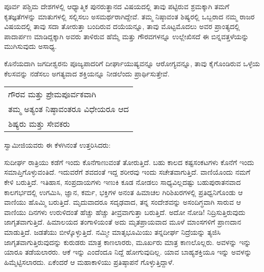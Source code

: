 ಪೂರ್ವ ಪಶ್ಚಿಮ ದೇಶಗಳಲ್ಲಿ ಆಧ್ಯಾತ್ಮಿಕ ಪುನರುತ್ಥಾನದ ವಿಷಯದಲ್ಲಿ ತಾವು ಪಟ್ಟಿರುವ ಶ್ರಮಕ್ಕಾಗಿ ತಮಗೆ ಕೃತಜ್ಞತೆಗಳನ್ನು ಮಾತುಗಳಲ್ಲಿ ಸಲ್ಲಿಸಲು ಅಸಮರ್ಥರಾಗಿದ್ದೇವೆ. ತಮ್ಮ ನಿಷ್ಠಾವಂತ ಶಿಷ್ಯರಲ್ಲಿ ಒಬ್ಬರಾದ ನಮ್ಮ ರಾಜರ ವಿಷಯದಲ್ಲಿ ತಾವು ಸದಾ ತೋರುತ್ತಾ ಬಂದಿರುವ ದಯೆಯನ್ನೂ, ತಾವು ಮೊಟ್ಟಮೊದಲು ಅವರ ಪ್ರಾಂತ್ಯದಲ್ಲಿ ಪಾದಾರ್ಪಣ ಮಾಡಿದ್ದಕ್ಕಾಗಿ ಅವರು ತಾಳಿರುವ ಹೆಮ್ಮೆ ಮತ್ತು ಗೌರವಗಳನ್ನೂ ಉಲ್ಲೇಖಿಸದೆ ಈ ಬಿನ್ನವತ್ತಳೆಯನ್ನು ಮುಗಿಸುವುದು ಅಸಾಧ್ಯ.

\vskip 2pt

ಕೊನೆಯದಾಗಿ ಜಗದೀಶ್ವರನು ಪೂಜ್ಯಪಾದರಿಗೆ ದೀರ್ಘಾಯುಷ್ಯವನ್ನೂ ಆರೋಗ್ಯವನ್ನೂ, ತಾವು ಕೈಗೊಂಡಿರುವ ಒಳ್ಳೆಯ ಕೆಲಸವನ್ನು ನಡೆಸಲು ಅಗತ್ಯವಾದ ಶಕ್ತಿಯನ್ನೂ ನೀಡಲೆಂದು ಪ್ರಾರ್ಥಿಸುತ್ತೇವೆ.

\medskip
\medskip

\begin{longtable}[r]{@{}l@{}}
ಗೌರವ ಮತ್ತು ಪ್ರೇಮಪೂರ್ವಕವಾಗಿ \\
ತಮ್ಮ ಅತ್ಯಂತ ನಿಷ್ಠಾವಂತರೂ ವಿಧೇಯರೂ ಆದ \\
ಶಿಷ್ಯರು ಮತ್ತು ಸೇವಕರು 
\end{longtable}

\medskip


ಸ್ವಾಮೀಜಿಯವರು ಈ ಕೆಳಗಿನಂತೆ ಉತ್ತರಿಸಿದರು:


\vskip 2pt

ಸುದೀರ್ಘ ರಾತ್ರಿಯು ಕಡೆಗೆ ಇಂದು ಕೊನೆಗಾಣುವಂತೆ ತೋರುತ್ತಿದೆ. ಬಹು ಕಾಲದ ಕಷ್ಟಸಂಕಟಗಳು ಕೊನೆಗೆ ಇಂದು ಸಮಾಪ್ತಿಗೊಳ್ಳುವಂತಿದೆ. ಇದುವರೆಗೆ ಶವದಂತೆ ಇದ್ದ ಶರೀರವು ಇಂದು ಸಚೇತವಾಗುತ್ತಿದೆ. ವಾಣಿಯೊಂದು ನಮಗೆ ಕೇಳಿ ಬರುತ್ತಿದೆ. ಇತಿಹಾಸ, ಸಂಪ್ರದಾಯಗಳು ಇಣುಕಿ ಕೂಡ ನೋಡಲು ಸಾಧ್ಯವಿಲ್ಲದಷ್ಟು ಬಹುಪುರಾತನವಾದ ಕಾಲಗರ್ಭದಲ್ಲಿ ಉಗಮಿಸಿ, ಜ್ಞಾನ, ಕರ್ಮ, ಭಕ್ತಿಗಳ ಅನಂತ ಹಿಮಾಚಲ ಗಿರಿಶಿಖರಗಳಲ್ಲಿ ಪ್ರತಿಧ್ವನಿಗೊಂಡು ಆ ವಾಣಿಯು ಹೊಮ್ಮಿ ಬರುತ್ತಿದೆ. ಮೃದುವಾದರೂ ಸದೃಢವಾದ, ತನ್ನ ಸಂದೇಶವನ್ನು ಅಸಂದಿಗ್ಧವಾಗಿ ಸಾರುವ ಆ ವಾಣಿಯು ದಿನಗಳು ಉರುಳಿದಂತೆ ಹೆಚ್ಚು ಹೆಚ್ಚು ತೀವ್ರವಾಗುತ್ತಾ ಬರುತ್ತಿದೆ. ಅದೋ ನೋಡಿ! ನಿದ್ರಿಸುತ್ತಿರುವುದು ಜಾಗೃತವಾಗುತ್ತಿದೆ. ಹಿಮಾಲಯದ ತಂಗಾಳಿಯಂತೆ ಅದು ಮೃತಪ್ರಾಯವಾದ ಮೂಳೆ ಮಾಂಸಗಳಿಗೆ ಪ್ರಾಣದಾನ ಮಾಡುತ್ತಿದೆ. ಜಡತೆಯು ಬೀಳ್ಕೊಳ್ಳುತ್ತಿದೆ. ನಮ್ಮೀ ಮಾತೃಭೂಮಿಯು ತನ್ನದೀರ್ಘ ನಿದ್ರೆಯನ್ನು ತ್ಯಜಿಸಿ ಜಾಗೃತವಾಗುತ್ತಿರುವುದನ್ನು ಕುರುಡರು ಮಾತ್ರ ಕಾಣ\-ಲಾರರು, ಮೂರ್ಖರು ಮಾತ್ರ ಕಾಣಲೊಲ್ಲರು. ಅವಳನ್ನು ಇನ್ನು ಯಾರೂ ತಡೆಯ\-ಲಾರರು. ಆಕೆ ಇನ್ನು ಎಂದೆಂದೂ ನಿದ್ದೆ ಹೋಗುವುದಿಲ್ಲ. ಯಾವ ಬಾಹ್ಯಶಕ್ತಿಯೂ ಇನ್ನು ಅವಳನ್ನು ಹಿಮ್ಮೆಟ್ಟಿಸಲಾರದು. ಏಕೆಂದರೆ ಆ ಮಹಾಕಾಳಿಯು ಪ್ರತಿಷ್ಠಾಪನೆ ಗೊಳ್ಳುತ್ತಿದ್ದಾಳೆ.

\eject

